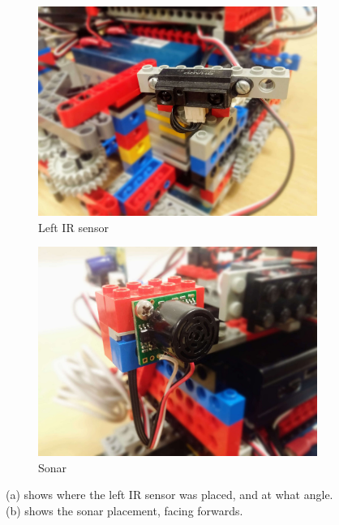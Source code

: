 \begin{figure}[ht]
    \centering
    \begin{subfigure}{0.49\textwidth}
        \includegraphics[width=\linewidth]{res/robot-pics/ir-sensor-placement.jpg}
        \caption{Left IR sensor}
        \label{fig:ir-sensor-placement}
    \end{subfigure}
    \begin{subfigure}{0.49\textwidth}
        \includegraphics[width=\linewidth]{res/robot-pics/sonar-placement.jpg}
        \caption{Sonar}
        \label{fig:sonar-placement}
    \end{subfigure}
    \caption{(a) shows where the left IR sensor was placed, and at what angle. (b) shows the sonar placement, facing forwards.}
    \label{fig:ir-and-sonar}
\end{figure}

